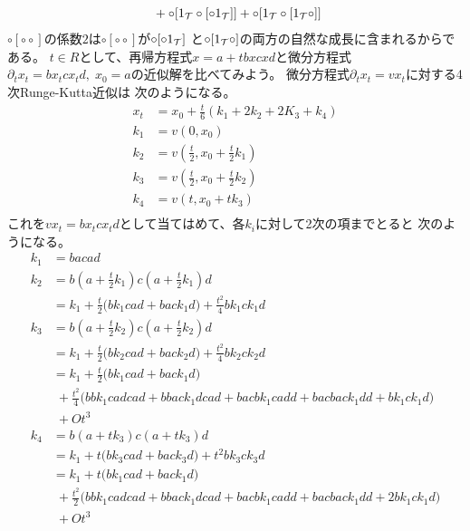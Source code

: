 {\begin{equation}
\begin{split}
		&\;+ \circ[1_{{\mathcal{T}}}\circ[\circ1_{{\mathcal{T}}}]] + \circ[1_{{\mathcal{T}}}\circ[1_{{\mathcal{T}}}\circ]] \\
	\end{split}\end{equation}
	$\circ[\circ\circ]$の係数$2$は$\circ[\circ\circ]$が$\circ[\circ1_{{\mathcal{T}}}]$
	と$\circ[1_{{\mathcal{T}}}\circ]$の両方の自然な成長に含まれるからである。
	$t\in R$として、再帰方程式$x=a+tbxcxd$と微分方程式
	$\partial_tx_t=bx_tcx_td,\;x_0=a$の近似解を比べてみよう。
	微分方程式$\partial_tx_t=vx_t$に対する4次Runge-Kutta近似は
	次のようになる。
	\begin{equation*}\begin{split}
		x_t &= x_0 + \frac{t}{6}(k_1 + 2k_2 + 2K_3 + k_4) \\
		k_1 &= v(0,x_0) \\
		k_2 &= v(\frac{t}{2}, x_0 + \frac{t}{2}k_1) \\
		k_3 &= v(\frac{t}{2}, x_0 + \frac{t}{2}k_2) \\
		k_4 &= v(t, x_0 + tk_3) \\
	\end{split}\end{equation*}
	これを$vx_t=bx_tcx_td$として当てはめて、各$k_i$に対して2次の項までとると
	次のようになる。
	\begin{equation*}\begin{split}
		k_1 &= bacad \\
		k_2 &= b(a+\frac{t}{2}k_1)c(a+\frac{t}{2}k_1)d \\
		&= k_1 + \frac{t}{2}\bigl(bk_1cad + back_1d\bigr)
			+ \frac{t^2}{4}bk_1ck_1d \\
		k_3 &= b(a+\frac{t}{2}k_2)c(a+\frac{t}{2}k_2)d \\
		&= k_1 + \frac{t}{2}\bigl(bk_2cad + back_2d\bigr)
			+ \frac{t^2}{4}bk_2ck_2d \\
		&= k_1 + \frac{t}{2}\bigl(bk_1cad + back_1d\bigr) \\
		&\;+ \frac{t^2}{4}\bigl(bbk_1cadcad + bback_1dcad
			+ bacbk_1cadd + bacback_1dd + bk_1ck_1d\bigr) \\
		&\;+ Ot^3 \\
		k_4 &= b(a+tk_3)c(a+tk_3)d \\
		&= k_1 + t\bigl(bk_3cad + back_3d\bigr) + t^2bk_3ck_3d \\
		&= k_1 + t\bigl(bk_1cad + back_1d\bigr) \\
		&\;+ \frac{t^2}{2}\bigl(bbk_1cadcad + bback_1dcad 
			+ bacbk_1cadd + bacback_1dd + 2bk_1ck_1d\bigr) \\
		&\;+ Ot^3 \\

\end{split}
\end{equation*}}
